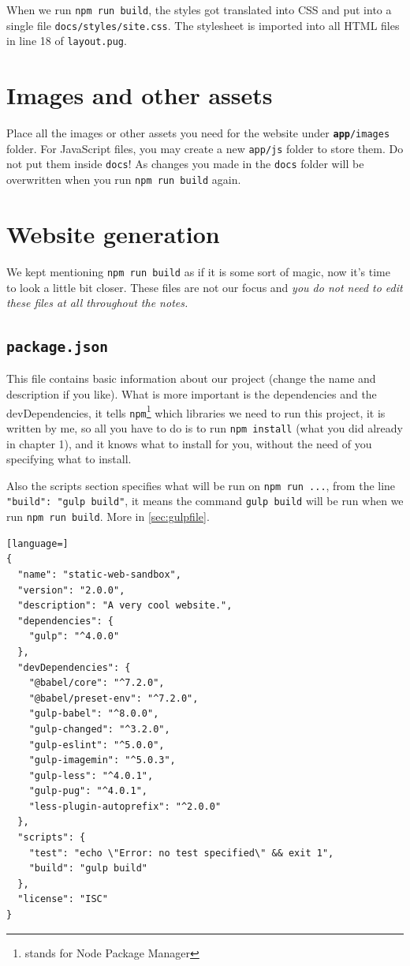 When we run \texttt{npm run build}, the styles got translated into CSS and put into a single file \texttt{docs/styles/site.css}. The stylesheet is imported into all HTML files in line 18 of \texttt{layout.pug}.

\section{Images and other assets}

Place all the images or other assets you need for the website under \texttt{\textbf{app}/images} folder. For JavaScript files, you may create a new \texttt{app/js} folder to store them. Do not put them inside \texttt{docs}! As changes you made in the \texttt{docs} folder will be overwritten when you run \texttt{npm run build} again.

\section{Website generation}
\label{sec:webgen}
We kept mentioning \texttt{npm run build} as if it is some sort of magic, now it's time to look a little bit closer. These files are not our focus and \textit{you do not need to edit these files at all throughout the notes.}

\subsection{\texttt{package.json}}

This file contains basic information about our project (change the name and description if you like). What is more important is the dependencies and the devDependencies, it tells \texttt{npm}\footnote{stands for Node Package Manager} which libraries we need to run this project, it is written by me, so all you have to do is to run \texttt{npm install} (what you did already in chapter 1), and it knows what to install for you, without the need of you specifying what to install.

Also the scripts section specifies what will be run on \texttt{npm run ...}, from the line \texttt{"build": "gulp build"}, it means the command \texttt{gulp build} will be run when we run \texttt{npm run build}. More in \cref{sec:gulpfile}.

\begin{lstlisting}[language=]
{
  "name": "static-web-sandbox",
  "version": "2.0.0",
  "description": "A very cool website.",
  "dependencies": {
    "gulp": "^4.0.0"
  },
  "devDependencies": {
    "@babel/core": "^7.2.0",
    "@babel/preset-env": "^7.2.0",
    "gulp-babel": "^8.0.0",
    "gulp-changed": "^3.2.0",
    "gulp-eslint": "^5.0.0",
    "gulp-imagemin": "^5.0.3",
    "gulp-less": "^4.0.1",
    "gulp-pug": "^4.0.1",
    "less-plugin-autoprefix": "^2.0.0"
  },
  "scripts": {
    "test": "echo \"Error: no test specified\" && exit 1",
    "build": "gulp build"
  },
  "license": "ISC"
}
\end{lstlisting}


